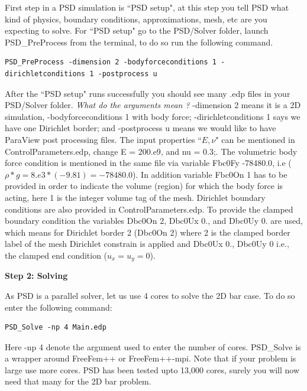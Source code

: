 First step in a PSD simulation is ``PSD setup", at this step you tell PSD what kind of physics, boundary conditions, approximations, mesh, etc are you expecting to solve.
For ``PSD setup" go to the {\ttfamily PSD/Solver} folder, launch  {\ttfamily PSD\_PreProcess} from the terminal, to do so run the following command.
\begin{lstlisting}[style=Linux]
PSD_PreProcess -dimension 2 -bodyforceconditions 1 -dirichletconditions 1 -postprocess u
\end{lstlisting}
%
After the ``PSD setup" runs successfully you should see many {\ttfamily .edp} files in your {\ttfamily PSD/Solver} folder. \textit{What do the arguments mean ?}  {\ttfamily -dimension 2} means it is a 2D simulation, {\ttfamily -bodyforceconditions 1} with body force; {\ttfamily -dirichletconditions 1} says we have one Dirichlet border; and {\ttfamily -postprocess u} means we would like to have ParaView post processing files. The input properties ``$E,\nu$" can be mentioned in {\ttfamily ControlParameters.edp}, change {\ttfamily E  = 200.e9}, and {\ttfamily nu = 0.3;}. The volumetric body force condition is mentioned in the same file via variable {\ttfamily Fbc0Fy -78480.0}, i.e ($\rho*g=8.e3*(-9.81)=-78480.0$). In addition variable {\ttfamily Fbc0On 1} has to be provided in order to indicate the volume (region) for which the body force is acting, here 1 is the integer volume tag of the mesh. Dirichlet boundary conditions are also provided in {\ttfamily ControlParameters.edp}. To provide the clamped boundary condition the variables   {\ttfamily Dbc0On 2}, {\ttfamily Dbc0Ux 0.}, and {\ttfamily Dbc0Uy 0.}  are used, which means for Dirichlet border 2 ({\ttfamily Dbc0On 2}) where 2 is the clamped border label of the mesh  Dirichlet constrain is applied and {{\ttfamily Dbc0Ux 0.}, {\ttfamily Dbc0Uy 0}} i.e., the clamped end condition ($u_x=u_y=0$).

\textbf{Step 2: Solving}

As PSD is a parallel solver, let us use  4 cores to solve the 2D bar case. To do so enter the following command:

\begin{lstlisting}[style=Linux]
PSD_Solve -np 4 Main.edp
\end{lstlisting}

Here {\ttfamily -np 4} denote the argument used to enter the number of cores. {\ttfamily PSD\_Solve} is a wrapper around {\ttfamily FreeFem++} or {\ttfamily FreeFem++-mpi}.  Note that if your problem is large use more cores. PSD has been tested upto 13,000 cores, surely you will now need that many for the 2D bar problem. 

